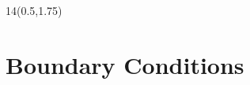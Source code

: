 
\begin{frame}{}
\renewcommand{\arraystretch}{1}
	\begin{textblock}{14}(0.5,1.75)
	\def\myfontsize{footnotesize}
	
	\end{textblock}
\end{frame}




\section{Boundary Conditions}
